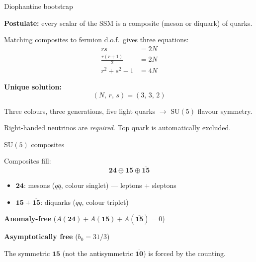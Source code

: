 \documentclass[aspectratio=169,12pt]{beamer}
\begin{document}
\begin{frame}{Diophantine bootstrap}

\textbf{Postulate:} every scalar of the SSM is a composite
(meson or diquark) of quarks.

\medskip
Matching composites to fermion d.o.f.\ gives three equations:
\begin{align*}
rs &= 2N \\
\tfrac{r(r+1)}{2} &= 2N \\
r^2 + s^2 - 1 &= 4N
\end{align*}

\pause
\textbf{Unique solution:}
\begin{equation*}
\boxed{(N,\,r,\,s) = (3,\,3,\,2)}
\end{equation*}

Three colours, three generations, five light quarks
$\to$ $\mathrm{SU}(5)$ flavour symmetry.

\medskip
Right-handed neutrinos are \emph{required}. Top quark is
automatically excluded.

\end{frame}

\begin{frame}{$\mathrm{SU}(5)$ composites}

Composites fill:
\begin{equation*}
\mathbf{24} \oplus \mathbf{15} \oplus \overline{\mathbf{15}}
\end{equation*}

\begin{itemize}
\item $\mathbf{24}$: mesons ($q\bar q$, colour singlet)
--- leptons + sleptons
\item $\mathbf{15} + \overline{\mathbf{15}}$:
diquarks ($qq$, colour triplet)
\end{itemize}

\bigskip
\textbf{Anomaly-free} ($A(\mathbf{24})+A(\mathbf{15})+A(\overline{\mathbf{15}})=0$)

\textbf{Asymptotically free} ($b_0 = 31/3$)

\bigskip
The symmetric $\mathbf{15}$ (not the antisymmetric
$\overline{\mathbf{10}}$) is forced by the counting.

\end{frame}
\end{document}
